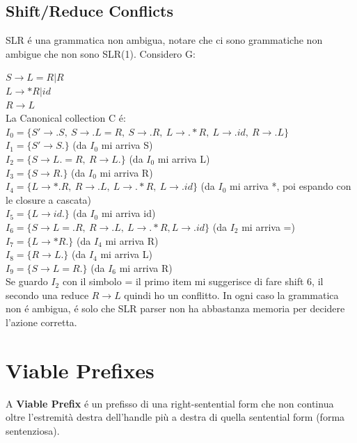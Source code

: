 \subsection{Shift/Reduce Conflicts}
SLR \'e una grammatica non ambigua, notare che ci sono grammatiche non ambigue che non sono SLR(1).
Considero G: 

$S \rightarrow L = R|R$\\
$L \rightarrow *R|id$\\
$R \rightarrow L$\\

La Canonical collection C \'e:\\
$I_0 = \{ S' \rightarrow .S,\ S \rightarrow .L = R,\ S \rightarrow .R,\ L \rightarrow .*R,\ L \rightarrow .id,\ R \rightarrow .L \}$\\
$I_1 = \{ S' \rightarrow S. \}$ (da $I_0$ mi arriva S)\\
$I_2 = \{ S  \rightarrow L.=R,\ R  \rightarrow L. \} $ (da $I_0$ mi arriva L)\\
$I_3 = \{ S  \rightarrow  R. \} $ (da $I_0$ mi arriva R)\\
$I_4 = \{ L \rightarrow *.R,\ R \rightarrow .L,\ L \rightarrow .*R,\ L \rightarrow .id \} $ (da $I_0$ mi arriva *, poi espando con le closure a cascata)\\
$I_5 = \{ L \rightarrow id.\}$ (da $I_0$ mi arriva id)\\
$I_6 = \{ S \rightarrow L = .R,\ R \rightarrow .L,\ L \rightarrow .*R, L \rightarrow .id \}$ (da $I_2$ mi arriva =)\\
$I_7 = \{ L \rightarrow *R. \}$ (da $I_4$ mi arriva R) \\
$I_8 = \{ R \rightarrow L. \}$ (da $I_4$ mi arriva L) \\
$I_9 = \{ S \rightarrow L = R. \}$ (da $I_6$ mi arriva R) \\

Se guardo $I_2$ con il simbolo = il primo item mi suggerisce di fare shift 6, il secondo una reduce $R \rightarrow L$ quindi ho un 
conflitto. In ogni caso la grammatica non \'e ambigua, \'e solo che SLR parser non ha abbastanza memoria per decidere l'azione corretta.

\section{Viable Prefixes}
A \textbf{Viable Prefix} \'e un prefisso di una right-sentential form che non continua
oltre l'estremità destra dell'handle più a destra di quella sentential form (forma sentenziosa).

